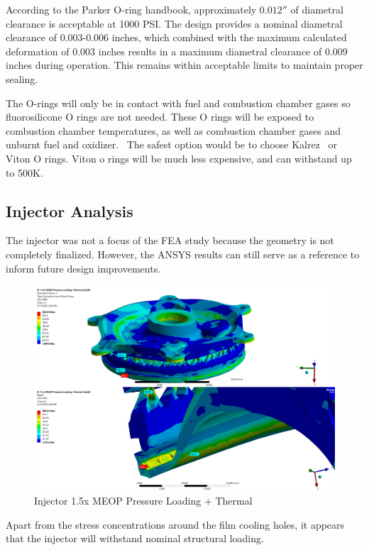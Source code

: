  According to the Parker O-ring handbook, approximately $0.012''$ of diametral clearance is acceptable at 1000 PSI. The design provides a nominal diametral clearance of $0.003$-$0.006$ inches, which combined with the maximum calculated deformation of $0.003$ inches results in a maximum diametral clearance of $0.009$ inches during operation. This remains within acceptable limits to maintain proper sealing.

The O-rings will only be in contact with fuel and combustion chamber gases so fluorosilicone O rings are not needed. These O rings will be exposed to combustion chamber temperatures, as well as combustion chamber gases and unburnt fuel and oxidizer.  The safest option would be to choose Kalrez  or Viton O rings. Viton o rings will be much less expensive, and can withstand up to 500K.  

\subsection{Injector Analysis
}
 The injector was not a focus of the FEA study because the geometry is not completely finalized. However, the ANSYS results can still serve as a reference to inform future design improvements. 
 \begin{figure}
     \centering
     \includegraphics[width=1\linewidth]{Images/Injector 1.5x MEOP Pressure Loading + Thermal.png}
     \caption{Injector 1.5x MEOP Pressure Loading + Thermal}
     \label{fig:Injector 1.5x MEOP Pressure Loading + Thermal}
 \end{figure}
Apart from the stress concentrations around the film cooling holes, it appears that the injector will withstand nominal structural loading.



